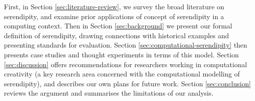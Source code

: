 First, in
Section \ref{sec:literature-review}, we survey the broad literature on
serendipity, and examine prior applications of concept of serendipity in a computing context.  Then in Section \ref{sec:background} we present our formal
definition of serendipity, drawing connections with historical examples 
and presenting standards for evaluation.  Section
\ref{sec:computational-serendipity} then presents case studies and
thought experiments in terms of this model.  Section
\ref{sec:discussion} offers recommendations for researchers working in
computational creativity (a key research area concerned with the computational modelling of serendipity), and describes our own plans for future
work.  Section \ref{sec:conclusion} reviews the argument and
summarises the limitations of our analysis.


